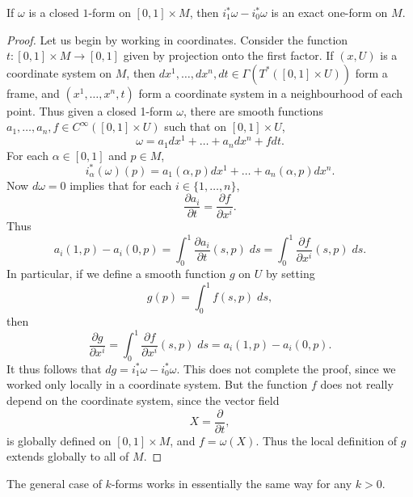 \begin{lemma}
    If $\omega$ is a closed $1$-form on $[0,1] \times M$, then $i_1^* \omega - i_0^* \omega$ is an exact one-form on $M$.
\end{lemma}
\begin{proof}
    Let us begin by working in coordinates. Consider the function $t: [0,1] \times M \to [0,1]$ given by projection onto the first factor. If $(x,U)$ is a coordinate system on $M$, then $dx^1, \dots, dx^n, dt \in \Gamma(T^*([0,1] \times U))$ form a frame, and $(x^1, \dots, x^n, t)$ form a coordinate system in a neighbourhood of each point. Thus given a closed 1-form $\omega$, there are smooth functions $a_1, \dots, a_n, f \in C^\infty([0,1] \times U)$ such that on $[0,1] \times U$,
    \[ \omega = a_1 dx^1 + \dots + a_n dx^n + f dt. \]
    For each $\alpha \in [0,1]$ and $p \in M$,
    \[ i_\alpha^*(\omega)(p) = a_1(\alpha,p) dx^1 + \dots + a_n(\alpha,p) dx^n. \]
    Now $d\omega = 0$ implies that for each $i \in \{ 1, \dots, n \}$,
    \[ \frac{\partial a_i}{\partial t} = \frac{\partial f}{\partial x^i}. \]
    Thus
    \[ a_i(1,p) - a_i(0,p) = \int_0^1 \frac{\partial a_i}{\partial t}(s,p)\; ds = \int_0^1 \frac{\partial f}{\partial x^i}(s,p)\; ds. \]
    In particular, if we define a smooth function $g$ on $U$ by setting
    \[ g(p) = \int_0^1 f(s,p)\; ds, \]
    then
    \[ \frac{\partial g}{\partial x^i} = \int_0^1 \frac{\partial f}{\partial x^i}(s,p)\; ds = a_i(1,p) - a_i(0,p). \]
    It thus follows that $dg = i_1^* \omega - i_0^* \omega$. This does not complete the proof, since we worked only locally in a coordinate system. But the function $f$ does not really depend on the coordinate system, since the vector field
    \[ X = \frac{\partial}{\partial t}, \] 
    is globally defined on $[0,1] \times M$, and $f = \omega(X)$. Thus the local definition of $g$ extends globally to all of $M$.
\end{proof}

The general case of $k$-forms works in essentially the same way for any $k > 0$.


